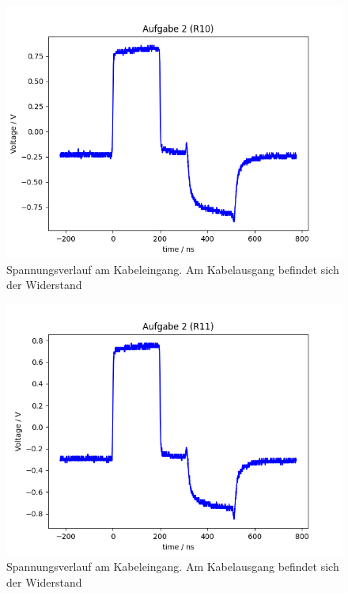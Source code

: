 \documentclass{article}
\begin{document}
\begin{figure}[H]
\centering
\caption{Spannungsverlauf am Kabeleingang. Am Kabelausgang befindet sich der Widerstand }
\label{fig:task2_R10}
\includegraphics[scale=0.6]{bilder/task2/task2_R10.png}
\end{figure}



\begin{figure}[H]
\centering
\caption{Spannungsverlauf am Kabeleingang. Am Kabelausgang befindet sich der Widerstand }
\label{fig:task2_R11}
\includegraphics[scale=0.6]{bilder/task2/task2_R11.png}
\end{figure}
\end{document}
